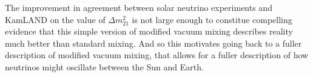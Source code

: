 The improvement in agreement between solar neutrino experiments and KamLAND on
the value of $\Delta m^{2}_{21}$ is not large enough to constitue compelling evidence
that this simple version of modified vacuum mixing describes reality much better
than standard mixing. And so this motivates going back to a fuller description
of modified vacuum mixing, that allows for a fuller description of how
neutrinos might oscillate between the Sun and Earth.

